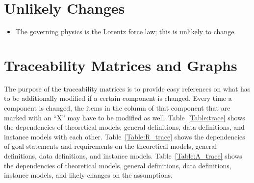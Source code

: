 \documentclass[12pt]{article}
\newcounter{ucnum} %
\begin{document}
\section{Unlikely Changes}    

\noindent \begin{itemize}

\item[UC\refstepcounter{ucnum}\theucnum\label{UC_noChange}:] The governing physics is the Lorentz force law; this is unlikely to change.

\end{itemize}

\section{Traceability Matrices and Graphs}

The purpose of the traceability matrices is to provide easy references on what
has to be additionally modified if a certain component is changed.  Every time a
component is changed, the items in the column of that component that are marked
with an ``X'' may have to be modified as well.  Table~\ref{Table:trace} shows the
dependencies of theoretical models, general definitions, data definitions, and
instance models with each other. Table~\ref{Table:R_trace} shows the
dependencies of goal statements and requirements on the theoretical models,
general definitions, data definitions, and instance models.
Table~\ref{Table:A_trace} shows the dependencies of theoretical models,
general definitions, data definitions, instance models, and likely changes on
the assumptions.



\end{document}
